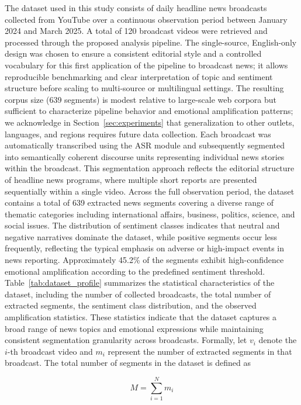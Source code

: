 \documentclass[final,1p,times]{elsarticle}
\begin{document}
The dataset used in this study consists of daily headline news broadcasts collected from YouTube over a continuous observation period between January 2024 and March 2025. A total of 120 broadcast videos were retrieved and processed through the proposed analysis pipeline. The single-source, English-only design was chosen to ensure a consistent editorial style and a controlled vocabulary for this first application of the pipeline to broadcast news; it allows reproducible benchmarking and clear interpretation of topic and sentiment structure before scaling to multi-source or multilingual settings. The resulting corpus size (639 segments) is modest relative to large-scale web corpora but sufficient to characterize pipeline behavior and emotional amplification patterns; we acknowledge in Section~\ref{sec:experiments} that generalization to other outlets, languages, and regions requires future data collection. Each broadcast was automatically transcribed using the ASR module and subsequently segmented into semantically coherent discourse units representing individual news stories within the broadcast. This segmentation approach reflects the editorial structure of headline news programs, where multiple short reports are presented sequentially within a single video. Across the full observation period, the dataset contains a total of 639 extracted news segments covering a diverse range of thematic categories including international affairs, business, politics, science, and social issues. The distribution of sentiment classes indicates that neutral and negative narratives dominate the dataset, while positive segments occur less frequently, reflecting the typical emphasis on adverse or high-impact events in news reporting. Approximately 45.2\% of the segments exhibit high-confidence emotional amplification according to the predefined sentiment threshold. Table~\ref{tab:dataset_profile} summarizes the statistical characteristics of the dataset, including the number of collected broadcasts, the total number of extracted segments, the sentiment class distribution, and the observed amplification statistics. These statistics indicate that the dataset captures a broad range of news topics and emotional expressions while maintaining consistent segmentation granularity across broadcasts. Formally, let $v_i$ denote the $i$-th broadcast video and $m_i$ represent the number of extracted segments in that broadcast. The total number of segments in the dataset is defined as

\[
M = \sum_{i=1}^{N} m_i
\]
\end{document}
